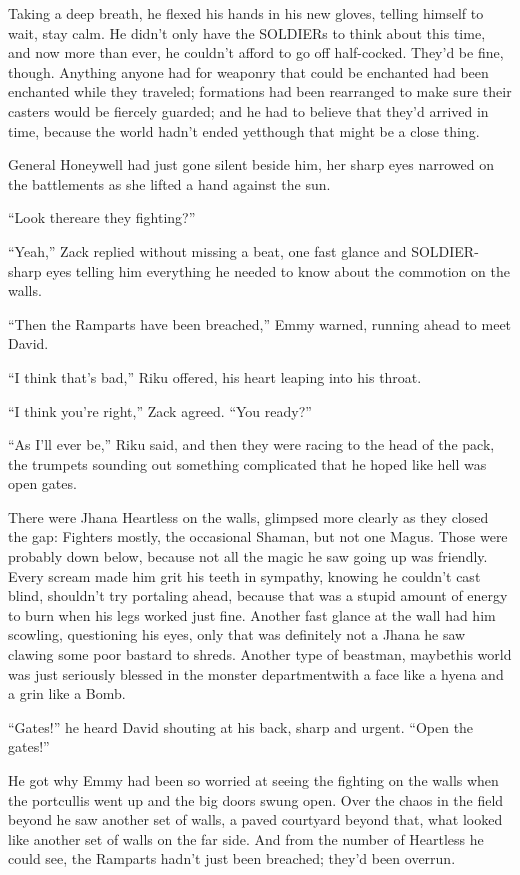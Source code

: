 Taking a deep breath, he flexed his hands in his new gloves, telling himself to wait, stay calm. He didn't only have the SOLDIERs to think about this time, and now more than ever, he couldn't afford to go off half-cocked. They'd be fine, though. Anything anyone had for weaponry that could be enchanted had been enchanted while they traveled; formations had been rearranged to make sure their casters would be fiercely guarded; and he had to believe that they'd arrived in time, because the world hadn't ended yet\textemdash though that might be a close thing.

General Honeywell had just gone silent beside him, her sharp eyes narrowed on the battlements as she lifted a hand against the sun.

``Look there\textemdash are they fighting?''

``Yeah,'' Zack replied without missing a beat, one fast glance and SOLDIER-sharp eyes telling him everything he needed to know about the commotion on the walls.

``Then the Ramparts have been breached,'' Emmy warned, running ahead to meet David.

``I think that's bad,'' Riku offered, his heart leaping into his throat.

``I think you're right,'' Zack agreed. ``You ready?''

``As I'll ever be,'' Riku said, and then they were racing to the head of the pack, the trumpets sounding out something complicated that he hoped like hell was open gates.

There were Jhana Heartless on the walls, glimpsed more clearly as they closed the gap: Fighters mostly, the occasional Shaman, but not one Magus. Those were probably down below, because not all the magic he saw going up was friendly. Every scream made him grit his teeth in sympathy, knowing he couldn't cast blind, shouldn't try portaling ahead, because that was a stupid amount of energy to burn when his legs worked just fine. Another fast glance at the wall had him scowling, questioning his eyes, only that was definitely not a Jhana he saw clawing some poor bastard to shreds. Another type of beastman, maybe\textemdash this world was just seriously blessed in the monster department\textemdash with a face like a hyena and a grin like a Bomb.

``Gates!'' he heard David shouting at his back, sharp and urgent. ``Open the gates!''

He got why Emmy had been so worried at seeing the fighting on the walls when the portcullis went up and the big doors swung open. Over the chaos in the field beyond he saw another set of walls, a paved courtyard beyond that, what looked like another set of walls on the far side. And from the number of Heartless he could see, the Ramparts hadn't just been breached; they'd been overrun.

